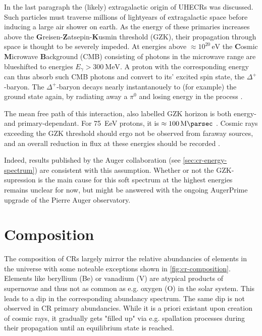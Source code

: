 In the last paragraph the (likely) extragalactic origin of UHECRs was discussed. Such particles must traverse millions of lightyears of extragalactic space before
inducing a large air shower on earth. As the energy of these primaries increases above the \textbf{G}reisen-\textbf{Z}atsepin-\textbf{K}usmin threshold (GZK),
their propagation through space is thought to be severely impeded. At energies above $\approx10^{20}\,\text{eV}$ the \textbf{C}osmic \textbf{M}icrowave
\textbf{B}ackground (CMB) consisting of photons in the microwave range are blueshifted to energies $E_\gamma > \SI{300}{\mega\electronvolt}$. A proton with the 
corresponding energy can thus absorb such CMB photons and convert to its' excited spin state, the $\Delta^+$-baryon. The $\Delta^+$-baryon decays nearly 
instantanouely to (for example) the ground state again, by radiating away a $\pi^0$ and losing energy in the process \cite{PDG}. 

The mean free path of this interaction, also labelled GZK horizon is both energy- and primary-dependant. For \SI{75}{\exa\electronvolt} protons, it is 
$\approx \SI{100}{\mega\parsec}$ \cite{greisen1966end}. Cosmic rays exceeding the GZK threshold should ergo not be observed from faraway sources, and an overall 
reduction in flux at these energies should be recorded \cite{zatsepin1966j}.

Indeed, results published by the Auger collaboration (see \autoref{sec:cr-energy-spectrum}) are consistent with this assumption. Whether or not the GZK-supression
is the main cause for this soft spectrum at the highest energies remains unclear for now, but might be answered with the ongoing 
AugerPrime upgrade of the Pierre Auger observatory. 

\section{Composition}
\label{sec:cr-composition}

The composition of CRs largely mirror the relative abundancies of elements in the universe with some noteable exceptions shown in \autoref{fig:cr-composition}.
Elements like beryllium (Be) or vanadium (V) are atypical products of supernovae and thus not as common as e.g. oxygen (O) \cite{gamezo2005three, cowan2004r} in
the solar system. This leads to a dip in the corresponding abundancy spectrum. The same dip is not observed in CR primary abundancies. While it is a priori 
existant upon creation of cosmic rays, it gradually gets "filled up" via e.g. spallation processes during their propagation until an equilibrium state is reached.

